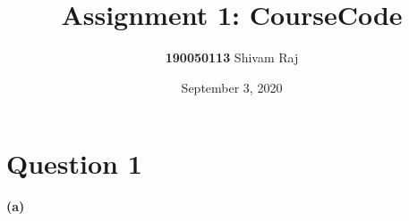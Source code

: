 \documentclass{article}
\title{Assignment 1: CourseCode}
\author{
  \textbf{190050113} Shivam Raj
}
\date{September 3, 2020}
\theoremstyle{remark}
\begin{document}
\maketitle
\tableofcontents

\newpage
{}

\section{Question 1}
\textbf{(a)} 
\end{document}
